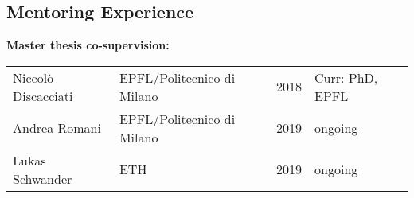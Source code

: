 \documentclass[margin]{res}
\begin{document}
\begin{resume}
\section{Mentoring Experience} 
               
                  \textbf{Master thesis co-supervision:}
                      \begin{table}[!h]
                       \begin{tabular}{llll}
                       Niccol\`{o} Discacciati & EPFL/Politecnico di Milano & 2018 & Curr: PhD, EPFL \\
                       Andrea Romani       & EPFL/Politecnico di Milano & 2019 & ongoing                \\
                       Lukas Schwander    & ETH                                         &  2019 & ongoing               
                        \end{tabular}
                        \end{table}
                                     


\end{resume}
\end{document}
